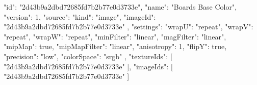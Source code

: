 {
  "id": "2d43b9a2dbd72685fd7b2b77e0d3733e",
  "name": "Boards Base Color",
  "version": 1,
  "source": {
    "kind": "image",
    "imageId": "2d43b9a2dbd72685fd7b2b77e0d3733e"
  },
  "settings": {
    "wrapU": "repeat",
    "wrapV": "repeat",
    "wrapW": "repeat",
    "minFilter": "linear",
    "magFilter": "linear",
    "mipMap": true,
    "mipMapFilter": "linear",
    "anisotropy": 1,
    "flipY": true,
    "precision": "low",
    "colorSpace": "srgb"
  },
  "textureIds": [
    "2d43b9a2dbd72685fd7b2b77e0d3733e"
  ],
  "imageIds": [
    "2d43b9a2dbd72685fd7b2b77e0d3733e"
  ]
}
